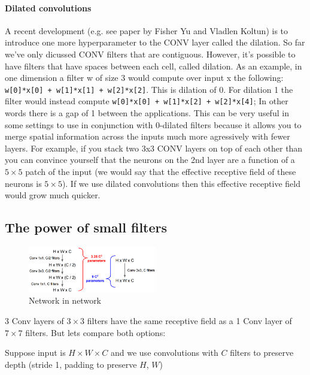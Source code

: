 \paragraph*{Dilated convolutions} A recent development (e.g. see paper by Fisher Yu and Vladlen Koltun) is to introduce one more hyperparameter to the CONV layer called the dilation. So far we’ve only dicussed CONV filters that are contiguous. However, it’s possible to have filters that have spaces between each cell, called dilation. As an example, in one dimension a filter w of size 3 would compute over input x the following: \texttt{w[0]*x[0] + w[1]*x[1] + w[2]*x[2]}. This is dilation of 0. For dilation 1 the filter would instead compute \texttt{w[0]*x[0] + w[1]*x[2] + w[2]*x[4]}; In other words there is a gap of 1 between the applications. This can be very useful in some settings to use in conjunction with 0-dilated filters because it allows you to merge spatial information across the inputs much more agressively with fewer layers. For example, if you stack two 3x3 CONV layers on top of each other than you can convince yourself that the neurons on the 2nd layer are a function of a $5 \times 5$ patch of the input (we would say that the effective receptive field of these neurons is $5 \times 5$). If we use dilated convolutions then this effective receptive field would grow much quicker.

\subsection*{The power of small filters}
\begin{figure}[h]
  \centering
  \includegraphics[width=0.5\textwidth]{Images/conv_layer/4.png}
  \caption{Network in network}
\end{figure}

3 Conv layers of $3 \times 3$ filters have the same receptive field as a 1 Conv layer of $7 \times 7$ filters. But lets compare both options:

Suppose input is $H \times W \times C$ and we use convolutions with $C$ filters to preserve depth (stride 1, padding to preserve $H$, $W$)

